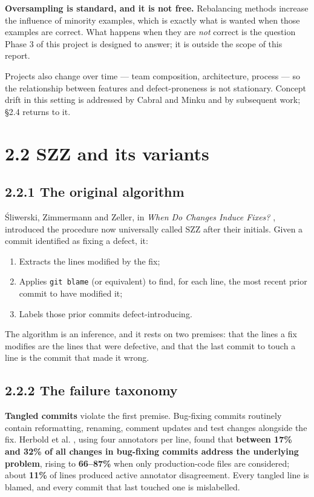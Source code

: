 \textbf{Oversampling is standard, and it is not free.} Rebalancing
methods increase the influence of minority examples, which is exactly
what is wanted when those examples are correct. What happens when they
are \emph{not} correct is the question Phase 3 of this project is
designed to answer; it is outside the scope of this report.

Projects also change over time --- team composition, architecture,
process --- so the relationship between features and defect-proneness is
not stationary. Concept drift in this setting is addressed by Cabral and
Minku \citep{cabral2019orb, cabral2023reliable} and by subsequent work;
\S{}2.4 returns to it.

\section{2.2 SZZ and its variants}\label{szz-and-its-variants}

\subsection{2.2.1 The original algorithm}\label{the-original-algorithm}

\'{S}liwerski, Zimmermann and Zeller, in \emph{When Do Changes Induce
Fixes?} \citep{sliwerski2005szz}, introduced the procedure now
universally called SZZ after their initials. Given a commit identified
as fixing a defect, it:

\begin{enumerate}
\def\labelenumi{\arabic{enumi}.}
\tightlist
\item
  Extracts the lines modified by the fix;
\item
  Applies \texttt{git\ blame} (or equivalent) to find, for each line,
  the most recent prior commit to have modified it;
\item
  Labels those prior commits defect-introducing.
\end{enumerate}

The algorithm is an inference, and it rests on two premises: that the
lines a fix modifies are the lines that were defective, and that the
last commit to touch a line is the commit that made it wrong.

\subsection{2.2.2 The failure taxonomy}\label{the-failure-taxonomy}

\textbf{Tangled commits} violate the first premise. Bug-fixing commits
routinely contain reformatting, renaming, comment updates and test
changes alongside the fix. Herbold et al. \citep{herbold2022tangling},
using four annotators per line, found that \textbf{between 17\% and 32\%
of all changes in bug-fixing commits address the underlying problem},
rising to \textbf{66--87\%} when only production-code files are
considered; about \textbf{11\%} of lines produced active annotator
disagreement. Every tangled line is blamed, and every commit that last
touched one is mislabelled.


